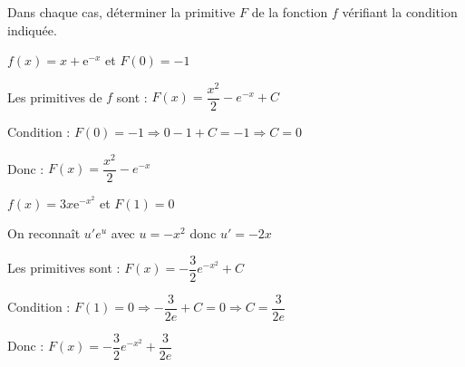 \documentclass[11pt,a4paper]{article}  %
\begin{document}
Dans chaque cas, déterminer la primitive $F$ de la fonction $f$ vérifiant la condition indiquée.
\begin{enumMet}
	\item $f(x)=x+\mathrm{e}^{-x}$ et $F(0)=-1$
	\begin{corrBox}
		Les primitives de $f$ sont : $F(x) = \dfrac{x^2}{2} - e^{-x} + C$
			
		Condition : $F(0) = -1 \Rightarrow 0 - 1 + C = -1 \Rightarrow C = 0$
			
		Donc : $F(x) = \dfrac{x^2}{2} - e^{-x}$
	\end{corrBox}
	\item $f(x)=3 x \mathrm{e}^{-x^2}$ et $F(1)=0$
	\begin{corrBox}
		On reconnaît $u'e^u$ avec $u = -x^2$ donc $u' = -2x$
			
		Les primitives sont : $F(x) = -\dfrac{3}{2}e^{-x^2} + C$
			
		Condition : $F(1) = 0 \Rightarrow -\dfrac{3}{2e} + C = 0 \Rightarrow C = \dfrac{3}{2e}$
			
		Donc : $F(x) = -\dfrac{3}{2}e^{-x^2} + \dfrac{3}{2e}$
	\end{corrBox}
\end{enumMet}

\vspace*{-0.5cm}
\exerciceDS{}
\end{document}
